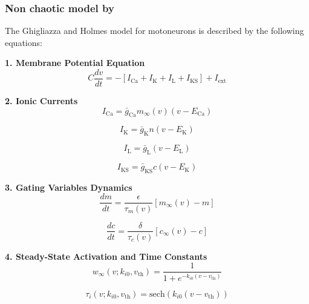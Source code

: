 \subsubsection{Non chaotic model by \textcite{ghigliazza_minimal_2004b}}
The Ghigliazza and Holmes model \parencite{ghigliazza_minimal_2004b} for motoneurons is described by the following equations:

\textbf{1. Membrane Potential Equation}
\begin{equation}
C \frac{dv}{dt} = -[I_{\text{Ca}} + I_{\text{K}} + I_{\text{L}} + I_{\text{KS}}] + I_{\text{ext}}
\end{equation}

\textbf{2. Ionic Currents}
\begin{equation}
I_{\text{Ca}} = \bar{g}_{\text{Ca}} m_{\infty}(v) (v - E_{\text{Ca}})
\end{equation}

\begin{equation}
I_{\text{K}} = \bar{g}_{\text{K}} n (v - E_{\text{K}})
\end{equation}

\begin{equation}
I_{\text{L}} = \bar{g}_{\text{L}} (v - E_{\text{L}})
\end{equation}

\begin{equation}
I_{\text{KS}} = \bar{g}_{\text{KS}} c (v - E_{\text{K}})
\end{equation}

\textbf{3. Gating Variables Dynamics}
\begin{equation}
\frac{dm}{dt} = \frac{\epsilon}{\tau_m(v)} [m_{\infty}(v) - m]
\end{equation}

\begin{equation}
\frac{dc}{dt} = \frac{\delta}{\tau_c(v)} [c_{\infty}(v) - c]
\end{equation}

\textbf{4. Steady-State Activation and Time Constants}
\begin{equation}
w_{\infty}(v; k_{i0}, v_{\text{th}}) = \frac{1}{1 + e^{-k_{i0} (v - v_{\text{th}})}}
\end{equation}

\begin{equation}
\tau_i(v; k_{i0}, v_{\text{th}}) = \text{sech}(k_{i0}(v - v_{\text{th}}))
\end{equation}

